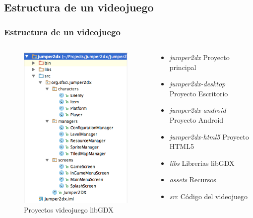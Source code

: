 \documentclass[xcolor={dvipsnames}]{beamer}
\begin{document}
\subsection{Estructura de un videojuego}
\begin{frame}\frametitle{Estructura de un videojuego}
    \begin{columns}
        \begin{column}{4cm}
        \begin{figure}
        \includegraphics[scale=0.3]{images/project_structure} 
        \caption{Proyectos videojuego libGDX}
        \end{figure}
        \end{column}
        \pause
        \begin{column}{6cm}
        \begin{block}{}
        \begin{itemize}
            \item \emph{\textcolor{resalta}{jumper2dx}} Proyecto principal
            \item \emph{\textcolor{resalta}{jumper2dx-desktop}} Proyecto Escritorio
            \item \emph{\textcolor{resalta}{jumper2dx-android}} Proyecto Android
            \item \emph{\textcolor{resalta}{jumper2dx-html5}} Proyecto HTML5
            \item \emph{\textcolor{resalta}{libs}} Librerias libGDX
            \item \emph{\textcolor{resalta}{assets}} Recursos
            \item \emph{\textcolor{resalta}{src}} Código del videojuego
        \end{itemize}
        \end{block}
        \end{column}
    \end{columns}
\end{frame}
\end{document}
